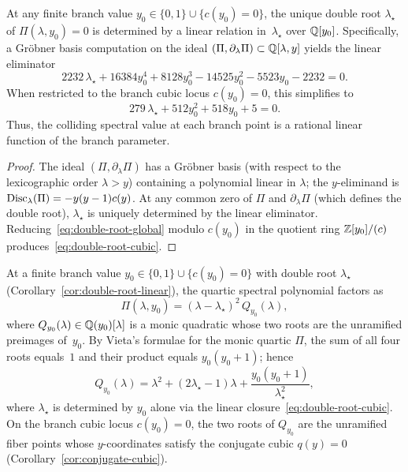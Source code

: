 \begin{corollary}\label{cor:double-root-linear}
At any finite branch value $y_0\in\{0,1\}\cup\{c(y_0)=0\}$, the unique double root $\lambda_\star$ of $\Pi(\lambda,y_0)=0$ is determined by a linear relation in~$\lambda_\star$ over $\mathbb{Q}[y_0]$.
Specifically, a Gr\"obner basis computation on the ideal $(\Pi,\partial_\lambda\Pi)\subset\mathbb{Q}[\lambda,y]$ yields the linear eliminator
\begin{equation}\label{eq:double-root-global}
2232\,\lambda_\star+16384y_0^4+8128y_0^3-14525y_0^2-5523y_0-2232=0.
\end{equation}
When restricted to the branch cubic locus $c(y_0)=0$, this simplifies to
\begin{equation}\label{eq:double-root-cubic}
279\,\lambda_\star+512y_0^2+518y_0+5=0.
\end{equation}
Thus, the colliding spectral value at each branch point is a rational linear function of the branch parameter.
\end{corollary}

\begin{proof}
The ideal $(\Pi,\partial_\lambda\Pi)$ has a Gr\"obner basis (with respect to the lexicographic order $\lambda>\!y$) containing a polynomial linear in $\lambda$; the $y$-eliminand is $\operatorname{Disc}_\lambda(\Pi)=-y(y-1)c(y)$.
At any common zero of $\Pi$ and $\partial_\lambda\Pi$ (which defines the double root), $\lambda_\star$ is uniquely determined by the linear eliminator.
Reducing~\eqref{eq:double-root-global} modulo $c(y_0)$ in the quotient ring $\mathbb{Z}[y_0]/(c)$ produces~\eqref{eq:double-root-cubic}.
\end{proof}

\begin{corollary}\label{cor:quadratic-cofactor}
At a finite branch value $y_0\in\{0,1\}\cup\{c(y_0)=0\}$ with double root $\lambda_\star$ (Corollary~\ref{cor:double-root-linear}), the quartic spectral polynomial factors as
\begin{equation}\label{eq:quadratic-cofactor}
\Pi(\lambda,y_0)=(\lambda-\lambda_\star)^2\,Q_{y_0}(\lambda),
\end{equation}
where $Q_{y_0}(\lambda)\in\mathbb{Q}(y_0)[\lambda]$ is a monic quadratic whose two roots are the unramified preimages of~$y_0$.
By Vieta's formulae for the monic quartic $\Pi$, the sum of all four roots equals~$1$ and their product equals $y_0(y_0+1)$; hence
\[
Q_{y_0}(\lambda)=\lambda^2+(2\lambda_\star-1)\lambda+\frac{y_0(y_0+1)}{\lambda_\star^2},
\]
where $\lambda_\star$ is determined by $y_0$ alone via the linear closure~\eqref{eq:double-root-cubic}.
On the branch cubic locus $c(y_0)=0$, the two roots of $Q_{y_0}$ are the unramified fiber points whose $y$-coordinates satisfy the conjugate cubic $q(y)=0$ (Corollary~\ref{cor:conjugate-cubic}).
\end{corollary}

